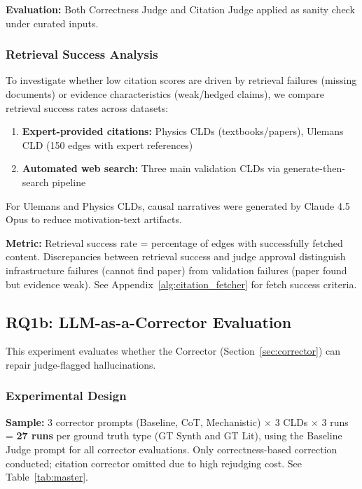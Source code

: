 \textbf{Evaluation:} Both Correctness Judge and Citation Judge applied as sanity check under curated inputs.

\subsubsection{Retrieval Success Analysis}
\label{sec:retrieval_success}

To investigate whether low citation scores are driven by retrieval failures (missing documents) or evidence characteristics (weak/hedged claims), we compare retrieval success rates across datasets:
\begin{enumerate}[noitemsep]
    \item \textbf{Expert-provided citations:} Physics CLDs (textbooks/papers), Ulemans CLD (150 edges with expert references)
    \item \textbf{Automated web search:} Three main validation CLDs via generate-then-search pipeline
\end{enumerate}

For Ulemans and Physics CLDs, causal narratives were generated by Claude 4.5 Opus to reduce motivation-text artifacts.

\textbf{Metric:} Retrieval success rate = percentage of edges with successfully fetched content. Discrepancies between retrieval success and judge approval distinguish infrastructure failures (cannot find paper) from validation failures (paper found but evidence weak). See Appendix~\ref{alg:citation_fetcher} for fetch success criteria.

\subsection{RQ1b: LLM-as-a-Corrector Evaluation}
\label{sec:rq1b}
\label{sec:rq1b_experiments}

This experiment evaluates whether the Corrector (Section~\ref{sec:corrector}) can repair judge-flagged hallucinations.

\subsubsection{Experimental Design}
\textbf{Sample:} 3 corrector prompts (Baseline, CoT, Mechanistic) $\times$ 3 CLDs $\times$ 3 runs = \textbf{27 runs} per ground truth type (GT Synth and GT Lit), using the Baseline Judge prompt for all corrector evaluations. Only correctness-based correction conducted; citation corrector omitted due to high rejudging cost. See Table~\ref{tab:master}.

